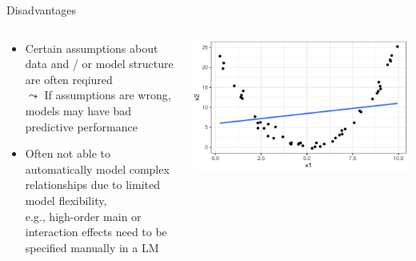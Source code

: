 \documentclass[11pt,compress,t,notes=noshow, aspectratio=169, xcolor=table]{beamer}
\begin{document}
\begin{frame}{Disadvantages}
\begin{columns}
\begin{column}{0.72\textwidth}
    \begin{itemize}%
    \itemsep1em
        \item<1-> Certain assumptions about data and / or model structure are often reqiured\\
        $\leadsto$ If assumptions are wrong, models may have bad predictive performance
        \item<2-> Often not able to automatically model complex relationships due to limited model flexibility, \\
        e.g., high-order main or interaction effects need to be specified manually in a LM
    \end{itemize}
\end{column}
\begin{column}{0.28\textwidth}
    \begin{center}
        \includegraphics[width = \textwidth]{figure/lm_bad_fit.pdf} 
    \end{center}
\end{column}
\end{columns}
\quad \\


\end{frame}
\end{document}
